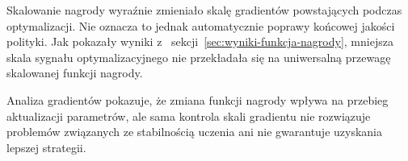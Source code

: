 Skalowanie nagrody wyraźnie zmieniało skalę gradientów powstających
podczas optymalizacji. Nie oznacza to jednak automatycznie poprawy
końcowej jakości polityki. Jak pokazały wyniki z~
sekcji~\ref{sec:wyniki-funkcja-nagrody}, mniejsza skala sygnału
optymalizacyjnego nie przekładała się na uniwersalną przewagę
skalowanej funkcji nagrody.

Analiza gradientów pokazuje,
że zmiana funkcji nagrody wpływa na przebieg aktualizacji parametrów,
ale sama kontrola skali gradientu nie rozwiązuje problemów związanych
ze stabilnością uczenia ani nie gwarantuje uzyskania lepszej
strategii.
